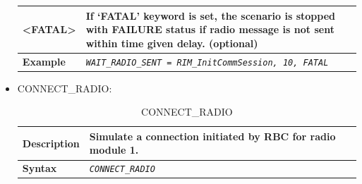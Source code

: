 \documentclass{template/openetcs}
\begin{document}
\begin{itemize}
\begin{longtable}{|l|l|l|}
				\hline
				
					\begin{minipage}[t]{0.22\linewidth} \textbf{<FATAL>} \end{minipage}
				&	\multicolumn{2}{l|}{	\begin{minipage}[t]{0.78\linewidth}	If ‘FATAL’ keyword is set, the scenario is stopped with FAILURE status if radio message is not sent within time given delay. (optional)	\end{minipage} } \\
				
				\hline
															
					\begin{minipage}[t]{0.22\linewidth} \textbf{Example} \end{minipage}
				&	\multicolumn{2}{l|}{ \begin{minipage}[t]{0.78\linewidth} \emph{\texttt{WAIT\_RADIO\_SENT = RIM\_InitCommSession, 10, FATAL}} \end{minipage} } \\
				
				\hline \hline
				
			\end{longtable}
			
		\item CONNECT\_RADIO:
												
			\begin{longtable}{|l|l|}
				\caption{CONNECT\_RADIO}\\ 
				\hline
				
					\begin{minipage}[t]{0.22\linewidth} \textbf{Description} \end{minipage} 
				&	\begin{minipage}[t]{0.78\linewidth} Simulate a connection initiated by RBC for radio module 1. \end{minipage} \\
				
				\hline
								
					\begin{minipage}[t]{0.22\linewidth} \textbf{Syntax} \end{minipage}
				&	\begin{minipage}[t]{0.78\linewidth} \emph{\texttt{CONNECT\_RADIO}} \end{minipage} \\
				
				\hline \hline
				
			\end{longtable}
			

\end{itemize}
\end{document}
